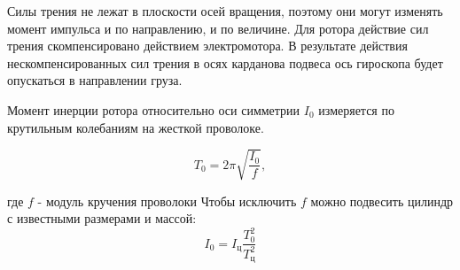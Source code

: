     
    Силы трения не лежат в плоскости осей вращения, поэтому они могут изменять момент импульса и по направлению, и по величине. Для ротора действие сил трения скомпенсировано действием электромотора. В результате действия нескомпенсированных сил трения в осях карданова подвеса ось гироскопа будет опускаться в направлении груза.
    
    Момент инерции ротора относительно оси симметрии $I_0$ измеряется по крутильным колебаниям на жесткой проволоке. 
    
    \begin{equation}
        T_0 = 2\pi\sqrt{\frac{I_0}{f}},
    \end{equation}
    
    где $f$ - модуль кручения проволоки
    Чтобы исключить $f$ можно подвесить цилиндр с известными размерами и массой:
    \begin{equation}
        I_0 = I_\text{ц}\frac{T_0^2}{T_\text{ц}^2}
    \end{equation}